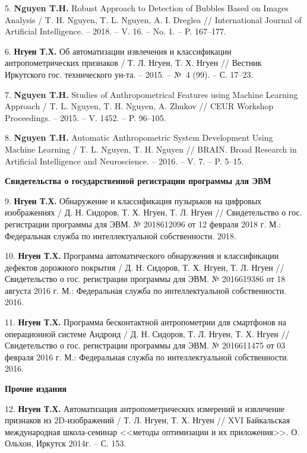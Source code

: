 5. \textbf{Nguyen T.H.} Robust Approach to Detection of Bubbles Based on Images Analysis / T. H. Nguyen, T. L. Nguyen, A. I. Dreglea // International Journal of Artificial Intelligence. -- 2018. -- V. 16. -- No. 1. -- P. 167--177.

6. \textbf{Нгуен Т.Х.} Об автоматизации извлечения и классификации антропометрических признаков / Т. Л. Нгуен, Т. Х. Нгуен // Вестник Иркутского гос. технического ун-та. -- 2015. -- №~4 (99). -- С. 17--23.

7. \textbf{Nguyen T.H.} Studies of Anthropometrical Features using Machine Learning Approach / T. L. Nguyen, T. H. Nguyen, A. Zhukov // CEUR Workshop Proceedings. -- 2015. -- V. 1452. -- P. 96--105.

8. \textbf{Nguyen T.H.} Automatic Anthropometric System Development Using Machine Learning / T. L. Nguyen, T. H. Nguyen // BRAIN. Broad Research in Artificial Intelligence and Neuroscience. -- 2016. -- V. 7. -- P. 5--15.

 \newpage \hspace{-1.5cm}\textbf{Свидетельства о государственной регистрации программы для ЭВМ}

9. \textbf{Нгуен Т.Х.} Обнаружение и классификация пузырьков на цифровых изображениях / Д. Н. Сидоров, Т. Х. Нгуен, Т. Л. Нгуен // Свидетельство о гос. регистрации программы для ЭВМ. № 2018612096 от 12 февраля 2018 г. М.: Федеральная служба по интеллектуальной собственности. 2018.

10. \textbf{Нгуен Т.Х.} Программа автоматического обнаружения и классификации дефектов дорожного покрытия / Д. Н. Сидоров, Т. Х. Нгуен, Т. Л. Нгуен // Свидетельство о гос. регистрации программы для ЭВМ. № 2016619386 от 18 августа 2016 г. М.: Федеральная служба по интеллектуальной собственности. 2016.

11. \textbf{Нгуен Т.Х.} Программа бесконтактной антропометрии для смартфонов на операционной системе Андроид / Д. Н. Сидоров, Т. Л. Нгуен, Т. Х. Нгуен // Свидетельство о гос. регистрации программы для ЭВМ. № 2016611475 от 03 февраля 2016 г. М.: Федеральная служба по интеллектуальной собственности. 2016.

	\hspace{-1.5cm}\textbf{Прочие издания}

12. \textbf{Нгуен Т.Х.} Автоматизация антропометрических измерений и извлечение признаков из 2D-изображений / Т. Л. Нгуен, Т. Х. Нгуен // XVI Байкальская международная школа-семинар <<методы оптимизации и их приложения>>. О. Ольхон, Иркутск 2014г. -- С. 153.

